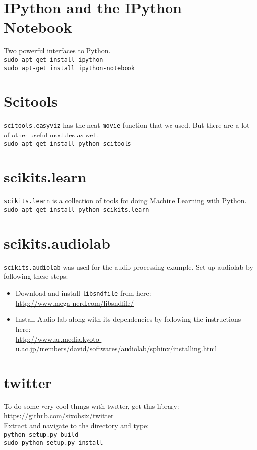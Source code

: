 \documentclass{article}
\begin{document}
\section{IPython and the IPython Notebook}
Two powerful interfaces to Python. \newline \\
\texttt{sudo apt-get install ipython} \newline \\ 
\texttt{sudo apt-get install ipython-notebook}

\section{Scitools}
\texttt{scitools.easyviz} has the neat \texttt{movie} function that we used. But
there are a lot of other useful modules as well. \newline \\ 
\texttt{sudo apt-get install python-scitools}

\section{scikits.learn}
\texttt{scikits.learn} is a collection of tools for doing Machine Learning with
Python. \newline \\
\texttt{sudo apt-get install python-scikits.learn}

\section{scikits.audiolab}
\texttt{scikits.audiolab} was used for the audio processing example. Set up 
audiolab by following these steps:
\begin{itemize}
\item Download and install \texttt{libsndfile} from here: \newline \\ 
\url{http://www.mega-nerd.com/libsndfile/}
\item Install Audio lab along with its dependencies by following the 
instructions here: 
\newline \\ 
\url{http://www.ar.media.kyoto-u.ac.jp/members/david/softwares/audiolab/sphinx/installing.html}
\end{itemize}

\section{twitter}
To do some very cool things with twitter, get this library: \newline \\ 
\url{https://github.com/sixohsix/twitter}
\newline \\ Extract and navigate to the directory and type: \newline \\ 
\texttt{python setup.py build} \newline \\ 
\texttt{sudo python setup.py install}
\end{document}
